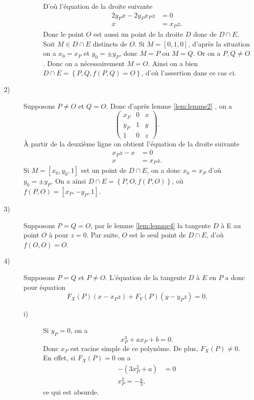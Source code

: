 \begin{demonstration}
\begin{description}
\begin{description}
               D'où l'équation de la droite suivante
               \begin{align*}
                   2y_Px - 2y_Px_Pz &= 0 \\
                   x &= x_Pz
               .\end{align*}
               Donc le point $O$ est aussi un point de la droite $D$ donc de $D \cap E$.  Soit $M \in  D \cap E$ distincts de $O$. Si $M = \left[ 0,1,0 \right]$, d'après la situation on a $x_0 =
               x_P$ et $y_0 = \pm y_P$, donc $M = P$ ou $M = Q$. Or on a $P,Q \neq O$. Donc on a nécessairement $M = O$. Ainsi on a bien $D \cap E = \left\{ P, Q, f(P,Q)= O \right\}$, d'où
               l'assertion dans ce cas ci.
            \end{description}
        \item[2)] Supposons $P \neq O$ et $Q = O$. Donc d'après lemme \ref{lem:lemme2} , on a
            \[
            \begin{pmatrix}
                x_P & 0 & x \\
                y_P & 1 & y \\
                1   & 0 & z
            \end{pmatrix}
            .\] 
            À partir de la deuxième ligne on obtient l'équation de la droite suivante
            \begin{align*}
                x_Pz - x &= 0 \\
                x &= x_Pz
            .\end{align*}
            Si $M = \left[ x_0, y_0, 1 \right]$ est un point de $D \cap E$, on a donc $x_0 = x_P$ d'où $y_0 = \pm y_P$.
        On a ainsi $D \cap E = \left\{ P, O, f(P,O) \right\}$, où $f(P,O) = \left[ x_P, - y_P, 1 \right]$.
    \item[3)] Supposons $P = Q = O$, par le lemme \ref{lem:lemme4}  la tangente $D$ à E au point $O$ à pour $z = 0$. Par suite, $O$ est le seul point de $D \cap E$, d'où $f(O,O) = O$.
    \item[4)] Supposons $P = Q$ et $P \neq O$. L'équation de la tangente $D$ à $E$ en $P$ a donc pour équation 
        \[
        F_{X}(P)\left( x - x_Pz \right) + F_{Y}(P)\left( y - y_Pz \right) = 0
        .\] 
        \begin{description}
            \item[i)] Si $y_P = 0$, on a
                \[
                x_P^3 + ax_P + b = 0
                .\] 
                Donc $x_P$ est racine simple de ce polynôme. De plus, $F_{X}(P) \neq 0$.
                En effet, si $F_{X}(P) = 0$ on a
                \begin{align*}
                    - \left( 3x_P^2 + a \right) &= 0 \\
                    x_P^2 = - \frac{a}{3}
                ,\end{align*}
                ce qui est absurde.


\end{description}
\end{description}
\end{demonstration}
